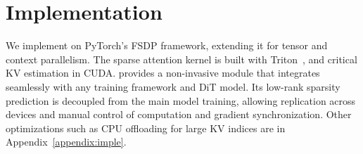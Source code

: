 
\section{Implementation}

We implement \sys on PyTorch's FSDP framework, extending it for tensor and context parallelism. The sparse attention kernel is built with Triton~\cite{openai_triton}, and critical KV estimation in CUDA. \sys provides a non-invasive module that integrates seamlessly with any training framework and DiT model. Its low-rank sparsity prediction is decoupled from the main model training, allowing replication across devices and manual control of computation and gradient synchronization.
Other optimizations such as CPU offloading for large KV indices are in Appendix~\ref{appendix:imple}.






